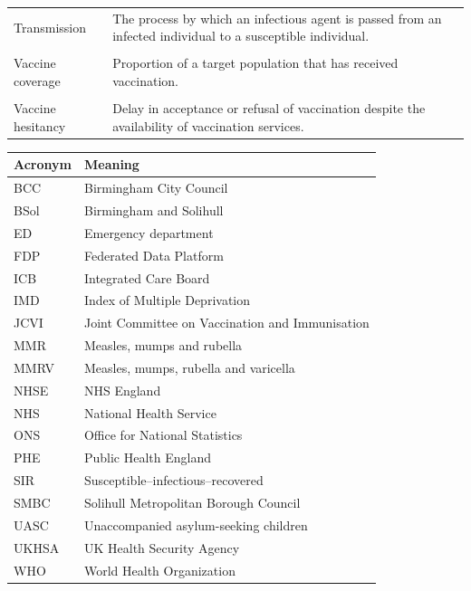 \documentclass[12pt]{article}
\begin{document}
\begin{table}[ht!]
\begin{tabularx}{\linewidth}{lX}
        Transmission &
        The process by which an infectious agent is passed from an infected individual to a susceptible individual. \\\\

        Vaccine coverage &
        Proportion of a target population that has received vaccination. \\\\

        Vaccine hesitancy &
        Delay in acceptance or refusal of vaccination despite the availability of vaccination services. \\

        \bottomrule
    \end{tabularx}
\end{table}

\newpage



\begin{table}[ht!]
    \centering
    \label{tab:acronyms}
    \begin{tabularx}{\linewidth}{lX}
        \toprule
        \textbf{Acronym} & \textbf{Meaning} \\
        \midrule
        BCC & Birmingham City Council \\
        BSol & Birmingham and Solihull \\
        ED & Emergency department \\
        FDP & Federated Data Platform \\
        ICB & Integrated Care Board \\
        IMD & Index of Multiple Deprivation \\
        JCVI & Joint Committee on Vaccination and Immunisation \\
        MMR & Measles, mumps and rubella \\
        MMRV & Measles, mumps, rubella and varicella \\
        NHSE & NHS England \\
        NHS & National Health Service \\
        ONS & Office for National Statistics \\
        PHE & Public Health England \\
        SIR & Susceptible--infectious--recovered \\
        SMBC & Solihull Metropolitan Borough Council \\
        UASC & Unaccompanied asylum-seeking children \\
        UKHSA & UK Health Security Agency \\
        WHO & World Health Organization \\
        \bottomrule
    \end{tabularx}
\end{table}
\end{document}
